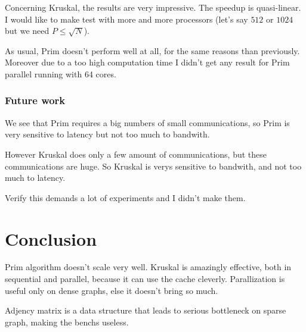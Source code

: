 \documentclass[a4paper, 10pt]{article}
\begin{document}
Concerning Kruskal, the results are very impressive. The speedup is quasi-linear. I would like to make test with more and more processors (let's say $512$ or $1024$ but we need $P \leq \sqrt{N}$).  
  
As usual, Prim doesn't perform well at all, for the same reasons than previously. Moreover due to a too high computation time I didn't get any result for Prim parallel running with 64 cores.  
  
\subsubsection{Future work}  
  
We see that Prim requires a big numbers of small communications, so Prim is very sensitive to latency but not too much to bandwith.  
  
However Kruskal does only a few amount of communications, but these communications are huge. So Kruskal is verys sensitive to bandwith, and not too much to latency.  
  
Verify this demands a lot of experiments and I didn't make them.    
  
\section{Conclusion}  
  
Prim algorithm doesn't scale very well. Kruskal is amazingly effective, both in sequential and parallel, because it can use the cache cleverly. Parallization is useful only on dense graphs, else it doesn't bring so much.  
  
Adjency matrix is a data structure that leads to serious bottleneck on sparse graph, making the benchs useless.  
\end{document}
